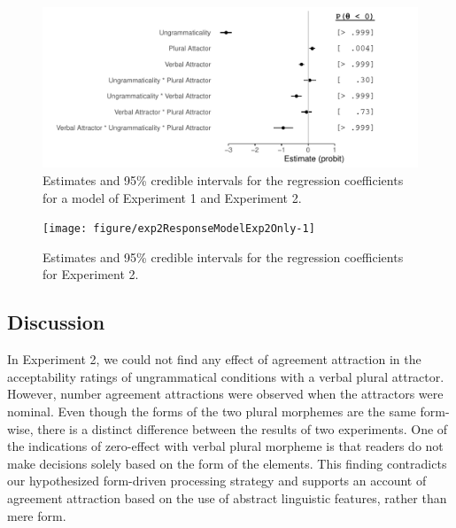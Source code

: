 \documentclass[doc,a4paper,man,natbib,floatsintext,noextraspace]{apa6}\usepackage[]{graphicx}\usepackage[]{color}
\makeatletter
\def\maxwidth{ %
  \ifdim\Gin@nat@width>\linewidth
    \linewidth
  \else
    \Gin@nat@width
  \fi
}
\newenvironment{knitrout}{}{} %
\makeatother
\begin{document}
\begin{knitrout}
\color{fgcolor}\begin{figure}

{\centering \includegraphics[width=\maxwidth]{figure/exp2ResponseModel-1} 

}

\caption[Estimates and 95\% credible intervals for the regression coefficients for a model of Experiment 1 and Experiment 2]{Estimates and 95\% credible intervals for the regression coefficients for a model of Experiment 1 and Experiment 2.}\label{fig:exp2ResponseModel}
\end{figure}


\end{knitrout}



\begin{knitrout}
\color{fgcolor}\begin{figure}

{\centering \texttt{[image: figure/exp2ResponseModelExp2Only-1]} 

}

\caption[Estimates and 95\% credible intervals for the regression coefficients for Experiment 2]{Estimates and 95\% credible intervals for the regression coefficients for Experiment 2.}\label{fig:exp2ResponseModelExp2Only}
\end{figure}


\end{knitrout}



\subsection{Discussion} \label{sec:exp2:discussion}


In Experiment 2, we could not find any effect of agreement attraction in the acceptability ratings of ungrammatical conditions with a verbal plural attractor. However, number agreement attractions were observed when the attractors were nominal. Even though the forms of the two plural morphemes are the same form-wise, there is a distinct difference between the results of two experiments. One of the indications of zero-effect with verbal plural morpheme is that readers do not make decisions solely based on the form of the elements. This finding contradicts our hypothesized form-driven processing strategy and supports an account of agreement attraction based on the use of abstract linguistic features, rather than mere form.
\end{document}
